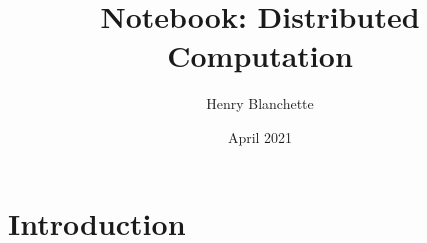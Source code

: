\documentclass{article}
\title{Notebook: Distributed Computation}
\author{Henry Blanchette}
\date{April 2021}
\begin{document}
\maketitle

\section{Introduction}
\end{document}

